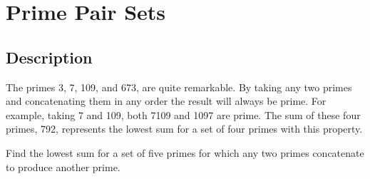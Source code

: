 \chapter{Prime Pair Sets}
\section{Description}
The primes 3, 7, 109, and 673, are quite remarkable. By taking any two primes and concatenating them in any order the
result will always be prime. For example, taking 7 and 109, both 7109 and 1097 are prime. The sum of these four primes,
792, represents the lowest sum for a set of four primes with this property.

Find the lowest sum for a set of five primes for which any two primes concatenate to produce another prime.
